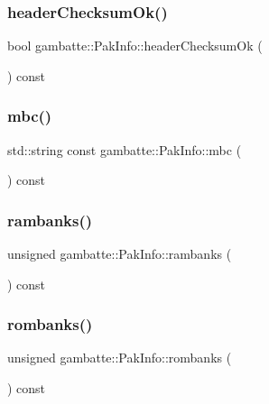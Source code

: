 \subsubsection{\texorpdfstring{header\+Checksum\+Ok()}{headerChecksumOk()}}
{\footnotesize\ttfamily bool gambatte\+::\+Pak\+Info\+::header\+Checksum\+Ok (\begin{DoxyParamCaption}{ }\end{DoxyParamCaption}) const}

\mbox{\label{classgambatte_1_1PakInfo_a87a389c4b21174bf5b00786181710edb}} 
\subsubsection{\texorpdfstring{mbc()}{mbc()}}
{\footnotesize\ttfamily std\+::string const gambatte\+::\+Pak\+Info\+::mbc (\begin{DoxyParamCaption}{ }\end{DoxyParamCaption}) const}

\mbox{\label{classgambatte_1_1PakInfo_aa9137e60d5bd20280ad65cc93c58fd8b}} 
\subsubsection{\texorpdfstring{rambanks()}{rambanks()}}
{\footnotesize\ttfamily unsigned gambatte\+::\+Pak\+Info\+::rambanks (\begin{DoxyParamCaption}{ }\end{DoxyParamCaption}) const}

\mbox{\label{classgambatte_1_1PakInfo_a65a29474a5687965c9a232efb0e1114a}} 
\subsubsection{\texorpdfstring{rombanks()}{rombanks()}}
{\footnotesize\ttfamily unsigned gambatte\+::\+Pak\+Info\+::rombanks (\begin{DoxyParamCaption}{ }\end{DoxyParamCaption}) const}



